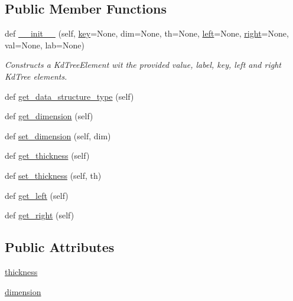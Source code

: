 \subsection*{Public Member Functions}
\begin{DoxyCompactItemize}
\item 
def \mbox{\hyperlink{classbridges_1_1kd__tree__element_1_1_k_d_tree_element_a8a53d645bf60df824cc552ac3d6e95e3}{\+\_\+\+\_\+init\+\_\+\+\_\+}} (self, \mbox{\hyperlink{classbridges_1_1bst__element_1_1_b_s_t_element_a8b4c0d8d6a2a7e0fefb013038d26f146}{key}}=None, dim=None, th=None, \mbox{\hyperlink{classbridges_1_1bin__tree__element_1_1_bin_tree_element_a1e475410000759a092959455957894b6}{left}}=None, \mbox{\hyperlink{classbridges_1_1bin__tree__element_1_1_bin_tree_element_a6cf0c7fefefd5eada106df191e055ff5}{right}}=None, val=None, lab=None)
\begin{DoxyCompactList}\small\item\em Constructs a Kd\+Tree\+Element wit the provided value, label, key, left and right Kd\+Tree elements. \end{DoxyCompactList}\item 
def \mbox{\hyperlink{classbridges_1_1kd__tree__element_1_1_k_d_tree_element_ac76e921a6607344f18ccd45a07873f1b}{get\+\_\+data\+\_\+structure\+\_\+type}} (self)
\item 
def \mbox{\hyperlink{classbridges_1_1kd__tree__element_1_1_k_d_tree_element_a4be42f046237f2f7e54aa4dc62b54f44}{get\+\_\+dimension}} (self)
\item 
def \mbox{\hyperlink{classbridges_1_1kd__tree__element_1_1_k_d_tree_element_a2a4b2e02aa5dbd3dcac62231888240ba}{set\+\_\+dimension}} (self, dim)
\item 
def \mbox{\hyperlink{classbridges_1_1kd__tree__element_1_1_k_d_tree_element_ab7f10ab9e9d16602103754e433a8bcb8}{get\+\_\+thickness}} (self)
\item 
def \mbox{\hyperlink{classbridges_1_1kd__tree__element_1_1_k_d_tree_element_a4e19fc719121edc0748b65b8a1d8da48}{set\+\_\+thickness}} (self, th)
\item 
def \mbox{\hyperlink{classbridges_1_1kd__tree__element_1_1_k_d_tree_element_ae4aa1b2997d4c19de95bfbcfbea14729}{get\+\_\+left}} (self)
\item 
def \mbox{\hyperlink{classbridges_1_1kd__tree__element_1_1_k_d_tree_element_a531d4c216e872a252cf8004930777a2c}{get\+\_\+right}} (self)
\end{DoxyCompactItemize}
\subsection*{Public Attributes}
\begin{DoxyCompactItemize}
\item 
\mbox{\hyperlink{classbridges_1_1kd__tree__element_1_1_k_d_tree_element_a3eb7cd079ee2f28341c5f505b5f9551a}{thickness}}
\item 
\mbox{\hyperlink{classbridges_1_1kd__tree__element_1_1_k_d_tree_element_a893137cbfc8bccee32c9d75a513ed16c}{dimension}}
\end{DoxyCompactItemize}
